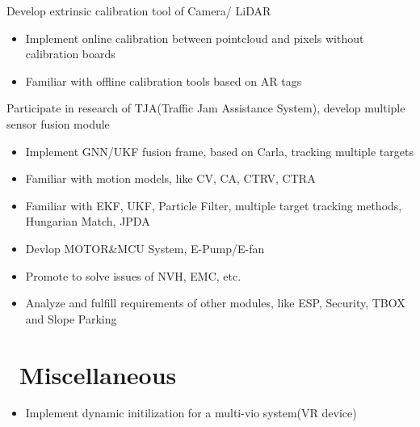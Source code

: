 \documentclass{resume}
\begin{document}
Develop extrinsic calibration tool of Camera/ LiDAR
\begin{itemize}
  \item Implement online calibration between pointcloud and pixels without calibration boards
  \item Familiar with offline calibration tools based on AR tags
\end{itemize}

Participate in research of TJA(Traffic Jam Assistance System), develop multiple sensor fusion module
\begin{itemize}
  \item Implement GNN/UKF fusion frame, based on Carla, tracking multiple targets
  \item Familiar with motion models, like CV, CA, CTRV, CTRA
  \item Familiar with EKF, UKF, Particle Filter, multiple target tracking methods, Hungarian Match, JPDA
\end{itemize}


\begin{itemize}
  \item Devlop MOTOR\&MCU System, E-Pump/E-fan
  \item Promote to solve issues of NVH, EMC, etc.
  \item Analyze and fulfill requirements of other modules, like ESP, Security, TBOX and Slope Parking
\end{itemize}


\section{\faCode\ Miscellaneous}
\begin{itemize}[parsep=0.5ex]
  \item Implement dynamic initilization for a multi-vio system(VR device)
\end{itemize}

%
%
\end{document}
